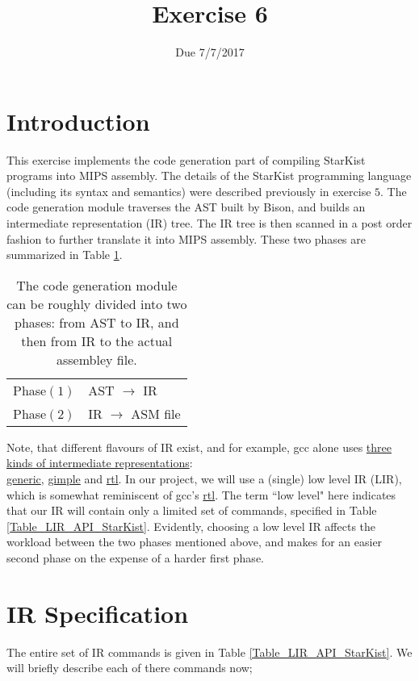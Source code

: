 \documentclass{article}
\begin{document}
\title{Exercise 6}
\date{Due 7/7/2017}
\maketitle

\section{Introduction}
This exercise implements the code generation part of compiling StarKist
programs into MIPS assembly. The details of the StarKist programming language
(including its syntax and semantics) were described previously in exercise $5$.
The code generation module traverses the AST built by Bison,
and builds an intermediate representation (IR) tree.
The IR tree is then scanned in a post order fashion
to further translate it into MIPS assembly.
These two phases are summarized in Table \ref{Table_The_Two_Phases_Of_Code_Gen}.
\begin{table}[h]
\centering
\begin{tabular}{ l l}
  Phase$(1)$   & AST $\rightarrow$ IR       \\
  Phase$(2)$   & IR  $\rightarrow$ ASM file \\
\end{tabular}
\caption{
The code generation module can be roughly divided into two phases:
from AST to IR, and then from IR to the actual assembley file.
\label{Table_The_Two_Phases_Of_Code_Gen}}
\end{table}
Note, that different flavours of IR exist, and for example,
gcc alone uses \href{https://gcc.gnu.org/onlinedocs/gccint/Tree-SSA.html#Tree-SSA}
{three kinds of intermediate representations}:\\
\href{https://gcc.gnu.org/onlinedocs/gccint/GENERIC.html#GENERIC}{generic},
\href{https://gcc.gnu.org/onlinedocs/gccint/GIMPLE.html#GIMPLE}{gimple} and
\href{https://gcc.gnu.org/onlinedocs/gccint/RTL.html#RTL}{rtl}.
In our project, we will use a (single) low level IR (LIR),
which is somewhat reminiscent of gcc's
\href{https://gcc.gnu.org/onlinedocs/gccint/RTL.html#RTL}{rtl}.
The term ``low level" here indicates that our IR will contain only a limited set
of commands, specified in Table \ref{Table_LIR_API_StarKist}.
Evidently, choosing a low level IR affects the workload between the two phases
mentioned above, and makes for an easier second phase on the expense of
a harder first phase.

\section{IR Specification}
The entire set of IR commands is given in Table \ref{Table_LIR_API_StarKist}.
We will briefly describe each of there commands now;
\end{document}
